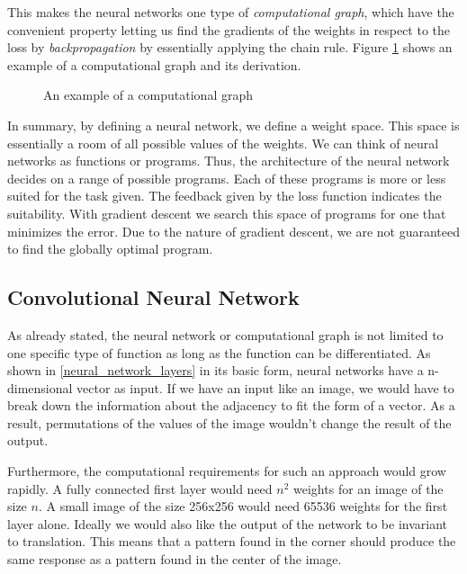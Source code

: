 This makes the neural networks one type of \textit{computational graph}, which have the convenient property letting us find the gradients of the weights in respect to the loss by \textit{backpropagation} by essentially applying the chain rule. Figure \ref{computational_graph} shows an example of a computational graph and its derivation.

\begin{figure}[!h]
    \centering
    \caption{An example of a computational graph}
    \label{computational_graph}
\end{figure}

In summary, by defining a neural network, we define a weight space. This space is essentially a room of all possible values of the weights. We can think of neural networks as functions or programs. Thus, the architecture of the neural network decides on a range of possible programs. Each of these programs is more or less suited for the task given. The feedback given by the loss function indicates the suitability. With gradient descent we search this space of programs for one that minimizes the error. Due to the nature of gradient descent, we are not guaranteed to find the globally optimal program.

\subsection{Convolutional Neural Network}
As already stated, the neural network or computational graph is not limited to one specific type of function as long as the function can be differentiated. As shown in \ref{neural_network_layers} in its basic form, neural networks have a n-dimensional vector as input. If we have an input like an image, we would have to break down the information about the adjacency to fit the form of a vector. As a result, permutations of the values of the image wouldn't change the result of the output.

Furthermore, the computational requirements for such an approach would grow rapidly. A fully connected first layer would need $n^2$ weights for an image of the size $n$. A small image of the size 256x256 would need 65536 weights for the first layer alone. Ideally we would also like the output of the network to be invariant to translation. This means that a pattern found in the corner should produce the same response as a pattern found in the center of the image.

